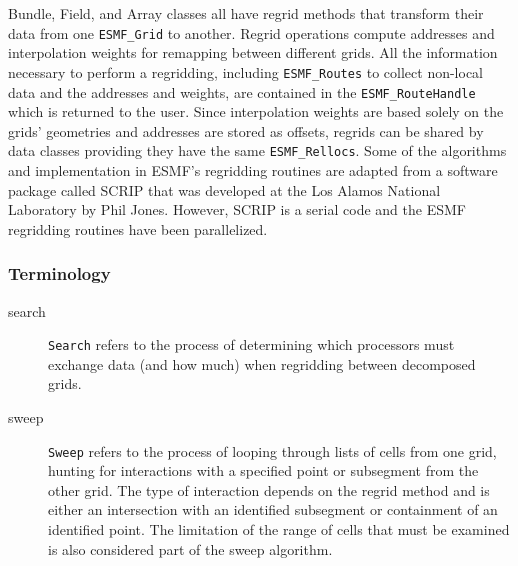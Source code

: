 %


Bundle, Field, and Array classes all have regrid methods that transform their
data from one {\tt ESMF\_Grid} to another.  Regrid operations compute addresses
and interpolation weights for remapping between different grids.  All
the information necessary to perform a regridding, including {\tt ESMF\_Routes}
to collect non-local data and the addresses and weights, are contained in the
{\tt ESMF\_RouteHandle} which is returned to the user.  Since interpolation
weights are based solely on the grids' geometries and addresses are stored
as offsets, regrids can be shared by data classes providing
they have the same {\tt ESMF\_Rellocs}.  Some of the algorithms and 
implementation in ESMF's regridding routines are adapted from a software package
called SCRIP that was developed at the Los Alamos National Laboratory by Phil
Jones.  However, SCRIP is a serial code and the ESMF regridding routines have
been parallelized.

\subsubsection{Terminology}

\begin{description}
\item[search]
     {\tt Search} refers to the process of determining which processors must
     exchange data (and how much) when regridding between decomposed grids. 
\item[sweep]
     {\tt Sweep} refers to the process of looping through lists of cells from
     one grid, hunting for interactions with a specified point or subsegment
     from the other grid.  The type of interaction depends on the regrid method
     and is either an intersection with an identified subsegment or containment
     of an identified point.  The limitation of the range of cells that must be
     examined is also considered part of the sweep algorithm.
\end{description}

